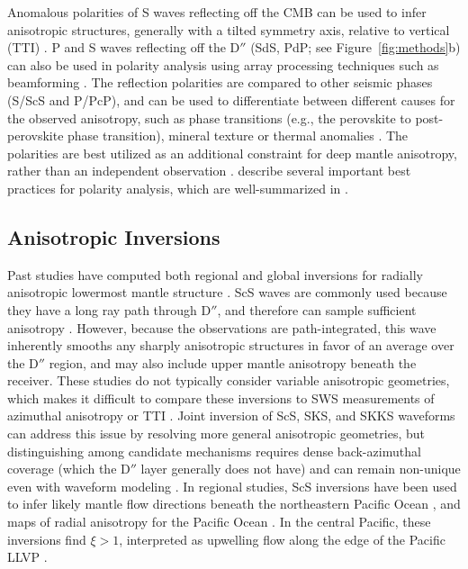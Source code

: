 \documentclass{standard}
\begin{document}
Anomalous polarities of S waves reflecting off the CMB can be used to infer anisotropic structures, generally with a tilted symmetry axis, relative to vertical (TTI) \parencite{garneroVariableAzimuthalAnisotropy2004}. P and S waves reflecting off the D$''$ (SdS, PdP; see Figure~\ref{fig:methods}b) can also be used in polarity analysis using array processing techniques such as beamforming \parencite{piscontiDiscriminatingCausesAnisotropy2019,piscontiMineralogyFabricDeformation2023}. The reflection polarities are compared to other seismic phases (S/ScS and P/PcP), and can be used to differentiate between different causes for the observed anisotropy, such as phase transitions (e.g., the perovskite to post-perovskite phase transition), mineral texture or thermal anomalies \parencite{thomasAnisotropyCausePolarity2011}. The polarities are best utilized as an additional constraint for deep mantle anisotropy, rather than an independent observation \parencite{wolfAdvancesMappingLowermost2024}. \textcite{piscontiDiscriminatingCausesAnisotropy2019,piscontiMineralogyFabricDeformation2023} describe several important best practices for polarity analysis, which are well-summarized in \textcite{wolfAdvancesMappingLowermost2024}.

\subsection{Anisotropic Inversions}

Past studies have computed both regional and global inversions for radially anisotropic lowermost mantle structure \parencite{frenchWholemantleRadiallyAnisotropic2014,aspletInversionShearWave2023}. ScS waves are commonly used because they have a long ray path through D$''$, and therefore can sample sufficient anisotropy \parencite{wolfAdvancesMappingLowermost2024}. However, because the observations are path-integrated, this wave inherently smooths any sharply anisotropic structures in favor of an average over the D$''$ region, and may also include upper mantle anisotropy beneath the receiver.
These studies do not typically consider variable anisotropic geometries, which makes it difficult to compare these inversions to SWS measurements of azimuthal anisotropy or TTI \parencite{wolfAdvancesMappingLowermost2024}. Joint inversion of ScS, SKS, and SKKS waveforms can address this issue by resolving more general anisotropic geometries, but distinguishing among candidate mechanisms requires dense back-azimuthal coverage (which the D$''$ layer generally does not have) and can remain non-unique even with waveform modeling \parencite{aspletInversionShearWave2023}. In regional studies, ScS inversions have been used to infer likely mantle flow directions beneath the northeastern Pacific Ocean \parencite{aspletInversionShearWave2023}, and maps of radial anisotropy for the Pacific Ocean \parencite{kawaiWaveformInversionLocalized2010,suzukiImagingPaleoslabsInferring2021}. In the central Pacific, these inversions find $\xi > 1$, interpreted as upwelling flow along the edge of the Pacific LLVP \parencite{kawaiWaveformInversionLocalized2010}.
\end{document}
